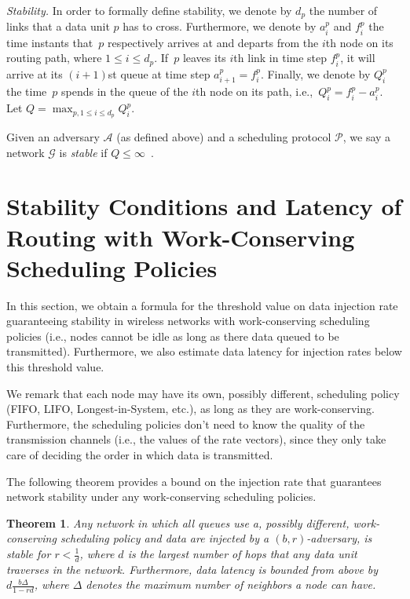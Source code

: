 \documentclass[journal,twocolumn]{./IEEEtran}
\newtheorem{theorem}{Theorem}
\begin{document}
\emph{Stability.} In order to formally define stability, we denote by $d_p$ the number of links that a data unit $p$ has to cross. Furthermore, we denote by $a_i^{p}$ and $f_i^{p}$ the time instants that~$p$ respectively arrives at and departs from  the $i$th node on its routing path, where $1 \le i \le d_p$. If~$p$ leaves its $i$th link in time step $f_i^{p}$, it will arrive at its $(i+1)$st queue at time step $a_{i+1}^{p} = f_i^{p}$. Finally, we denote by $Q_i^{p}$ the time~$p$  spends in the queue of the $i$th node on its path, i.e.,~$Q_i^{p}=f_i^{p}-a_i^{p}$. Let $Q=\max_{p,1 \le i \le d_p}Q_i^{p}$.


Given an adversary $\mathcal{A}$ (as defined above) and a scheduling protocol $\mathcal{P}$, we say a network $\mathcal{G}$ is \emph{stable} if $Q \leq \infty$~\cite{DBLP:journals/talg/AndrewsZ07}.




\section{Stability Conditions and Latency of Routing with
Work-Conserving Scheduling Policies}
\label{sec:wc}

In this section, we obtain 
a formula for
the threshold value on data injection rate guaranteeing stability in wireless networks with work-conserving scheduling policies (i.e., nodes cannot be idle as long as there data queued to be transmitted). Furthermore, we also estimate data latency for injection rates below this threshold value.



We remark that each node may have its own, possibly different, scheduling policy (FIFO, LIFO, Longest-in-System, etc.), as long as they are work-conserving. Furthermore, the scheduling policies don't need to know the quality of the transmission channels (i.e., the values of the rate vectors), since they only take care of deciding the order in which data is transmitted.


The following theorem provides a bound on the injection rate that guarantees network stability under any work-conserving scheduling
policies.



\begin{theorem}
\label{ref:workconservingtheorem}
Any network in which all queues use a, possibly different, work-conserving scheduling policy and data 
are
injected by a $(b,r)$-adversary, is stable 
for
$r < \frac{1}{d}$, where $d$ is the largest number of hops that any data unit 
traverses
in the network. 
Furthermore, 
data latency
is bounded from above by $d \frac{b \Delta}{1-r d}$, where $\Delta$ denotes the maximum number of neighbors a node can have.
\end{theorem}
\end{document}
